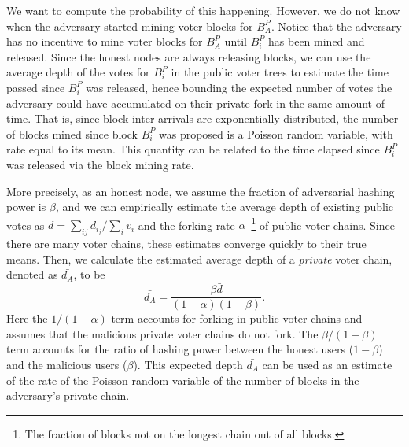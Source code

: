 We want to compute the probability of this happening.
However, we do not know when the adversary started mining voter blocks for $B^P_A$.
Notice that the adversary has no incentive to mine voter blocks for $B^P_A$ until $B^P_i$ has been mined and released. 
Since the honest nodes are always releasing blocks, we can use the average depth of the votes for $B^P_i$ in the public voter trees to estimate the time passed since $B^P_i$ was released, hence  bounding the expected number of votes the adversary could have accumulated on their private fork in the same amount of time. 
That is, since block inter-arrivals are exponentially distributed, the number of blocks mined since block $B^P_i$ was proposed is a Poisson random variable, with rate equal to its mean. 
This quantity can be related to the time elapsed since $B^P_i$ was released via the block mining rate.

More precisely, as an honest node, we assume the fraction of adversarial hashing power is $\beta$, and we can empirically estimate the average depth of existing public votes as $\bar{d}=\sum_{ij}{d_{i_j}}/\sum_{i}{v_i}$ and the forking rate $\alpha$~\footnote{The fraction of blocks not on the longest chain out of all blocks.} of public voter chains. 
Since there are many voter chains, these estimates converge quickly to their true means. 
Then, we calculate the estimated average depth of a \emph{private} voter chain, denoted as $\bar{d_A}$, to be
$$\bar{d_A} = \frac{\beta \bar{d}}{(1-\alpha)(1-\beta)}.$$
Here the $1/(1-\alpha)$ term accounts for forking in public voter chains and assumes that the malicious private voter chains do not fork. The $\beta / (1-\beta)$ term accounts for the ratio of hashing power between the honest users ($1-\beta$) and the malicious users ($\beta$).
This expected depth $\bar{d_A}$ can be used as an estimate of the rate of the Poisson random variable of the number of blocks in the adversary's  private chain. 


